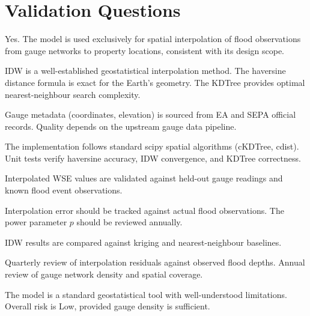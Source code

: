 \documentclass[11pt,a4paper]{article}
\begin{document}
\section{Validation Questions}

Yes. The model is used exclusively for spatial interpolation of flood observations
from gauge networks to property locations, consistent with its design scope.

IDW is a well-established geostatistical interpolation method. The haversine
distance formula is exact for the Earth's geometry. The KDTree provides
optimal nearest-neighbour search complexity.

Gauge metadata (coordinates, elevation) is sourced from EA and SEPA official
records. Quality depends on the upstream gauge data pipeline.

The implementation follows standard scipy spatial algorithms (cKDTree, cdist).
Unit tests verify haversine accuracy, IDW convergence, and KDTree correctness.

Interpolated WSE values are validated against held-out gauge readings and
known flood event observations.

Interpolation error should be tracked against actual flood observations.
The power parameter $p$ should be reviewed annually.

IDW results are compared against kriging and nearest-neighbour baselines.

Quarterly review of interpolation residuals against observed flood depths.
Annual review of gauge network density and spatial coverage.

The model is a standard geostatistical tool with well-understood limitations.
Overall risk is Low, provided gauge density is sufficient.
\end{document}

